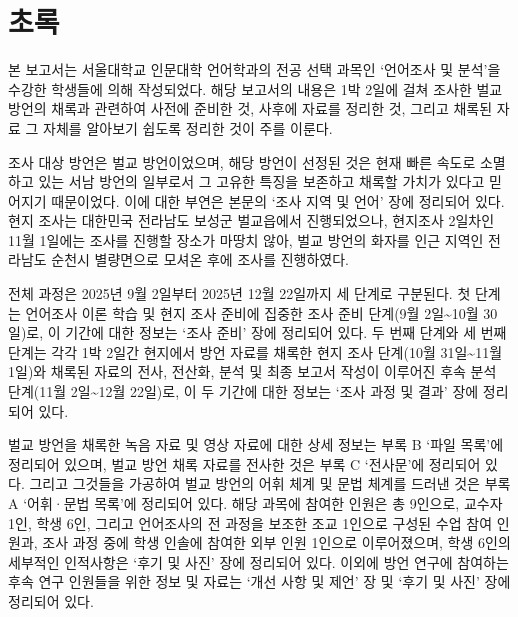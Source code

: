 \chapter{초록}

본 보고서는 서울대학교 인문대학 언어학과의 전공 선택 과목인 `언어조사 및 분석'을 수강한 학생들에 의해 작성되었다. 해당 보고서의 내용은 1박 2일에 걸쳐 조사한 벌교 방언의 채록과 관련하여 사전에 준비한 것, 사후에 자료를 정리한 것, 그리고 채록된 자료 그 자체를 알아보기 쉽도록 정리한 것이 주를 이룬다.

조사 대상 방언은 벌교 방언이었으며, 해당 방언이 선정된 것은 현재 빠른 속도로 소멸하고 있는 서남 방언의 일부로서 그 고유한 특징을 보존하고 채록할 가치가 있다고 믿어지기 때문이었다. 이에 대한 부연은 본문의 `조사 지역 및 언어' 장에 정리되어 있다. 현지 조사는 대한민국 전라남도 보성군 벌교읍에서 진행되었으나, 현지조사 2일차인 11월 1일에는 조사를 진행할 장소가 마땅치 않아, 벌교 방언의 화자를 인근 지역인 전라남도 순천시 별량면으로 모셔온 후에 조사를 진행하였다.

전체 과정은 2025년 9월 2일부터 2025년 12월 22일까지 세 단계로 구분된다. 첫 단계는 언어조사 이론 학습 및 현지 조사 준비에 집중한 조사 준비 단계(9월 2일\textasciitilde{}10월 30일)로,  이 기간에 대한 정보는 `조사 준비' 장에 정리되어 있다. 두 번째 단계와 세 번째 단계는 각각 1박 2일간 현지에서 방언 자료를 채록한 현지 조사 단계(10월 31일\textasciitilde{}11월 1일)와 채록된 자료의 전사, 전산화, 분석 및 최종 보고서 작성이 이루어진 후속 분석 단계(11월 2일\textasciitilde{}12월 22일)로, 이 두 기간에 대한 정보는 `조사 과정 및 결과' 장에 정리되어 있다.

벌교 방언을 채록한 녹음 자료 및 영상 자료에 대한 상세 정보는 부록 B `파일 목록'에 정리되어 있으며, 벌교 방언 채록 자료를 전사한 것은 부록 C `전사문'에 정리되어 있다. 그리고 그것들을 가공하여 벌교 방언의 어휘 체계 및 문법 체계를 드러낸 것은 부록 A `어휘·문법 목록'에 정리되어 있다. 해당 과목에 참여한 인원은 총 9인으로, 교수자 1인, 학생 6인, 그리고 언어조사의 전 과정을 보조한 조교 1인으로 구성된 수업 참여 인원과, 조사 과정 중에 학생 인솔에 참여한 외부 인원 1인으로 이루어졌으며, 학생 6인의 세부적인 인적사항은  `후기 및 사진' 장에 정리되어 있다. 이외에 방언 연구에 참여하는 후속 연구 인원들을 위한 정보 및 자료는 `개선 사항 및 제언' 장 및 `후기 및 사진' 장에 정리되어 있다.
